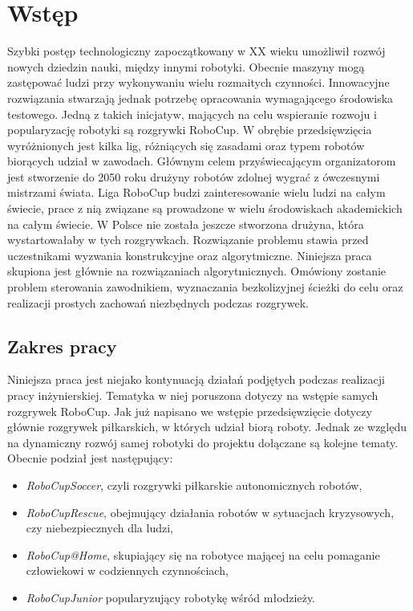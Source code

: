 \chapter[Wstęp ]{Wstęp}
Szybki postęp technologiczny zapoczątkowany w XX wieku umożliwił rozwój nowych dziedzin nauki, między innymi robotyki. Obecnie maszyny mogą zastępować ludzi przy wykonywaniu wielu rozmaitych czynności.
Innowacyjne rozwiązania stwarzają jednak potrzebę opracowania wymagającego środowiska testowego. Jedną z takich inicjatyw, mających na celu wspieranie rozwoju i popularyzację robotyki są rozgrywki
RoboCup. W obrębie przedsięwzięcia wyróżnionych jest kilka lig, różniących się zasadami oraz typem robotów biorących udział w zawodach.
Głównym celem przyświecającym organizatorom jest stworzenie do 2050 roku drużyny robotów zdolnej wygrać z ówczesnymi mistrzami świata.
Liga RoboCup budzi zainteresowanie wielu ludzi na całym świecie, prace z nią związane  są prowadzone w wielu środowiskach akademickich na całym świecie.
W Polsce nie została jeszcze stworzona drużyna, która wystartowałaby w tych rozgrywkach.
Rozwiązanie problemu stawia przed uczestnikami wyzwania konstrukcyjne oraz algorytmiczne. Niniejsza praca skupiona jest głównie na rozwiązaniach algorytmicznych. Omówiony zostanie problem sterowania
zawodnikiem, wyznaczania bezkolizyjnej ścieżki do celu oraz realizacji prostych zachowań niezbędnych podczas rozgrywek.
\section{Zakres pracy}
Niniejsza praca jest niejako kontynuacją działań podjętych podczas realizacji pracy inżynierskiej. Tematyka w niej poruszona dotyczy na wstępie samych rozgrywek RoboCup. Jak już napisano we 
wstępie przedsięwzięcie dotyczy głównie rozgrywek piłkarskich, w których udział biorą roboty. Jednak ze względu na dynamiczny rozwój samej robotyki do projektu dołączane są kolejne tematy.
Obecnie podział jest następujący:
\begin{itemize}
	\item \emph{RoboCupSoccer}, czyli rozgrywki piłkarskie autonomicznych robotów,
	\item \emph{RoboCupRescue}, obejmujący działania robotów w sytuacjach kryzysowych, czy niebezpiecznych dla ludzi,
	\item \emph{RoboCup@Home}, skupiający się na robotyce mającej na celu pomaganie człowiekowi w codziennych czynnościach,
	\item \emph{RoboCupJunior} popularyzujący robotykę wśród młodzieży.
\end{itemize}

